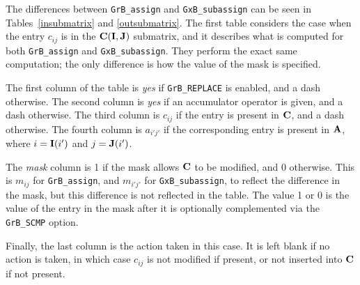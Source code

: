 \documentclass[12pt]{article}
\begin{document}
The differences between \verb'GrB_assign' and
\verb'GxB_subassign' can be seen in Tables~\ref{insubmatrix} and
\ref{outsubmatrix}.  The first table considers the case when the entry $c_{ij}$
is in the ${\bf C(I,J)}$ submatrix, and it describes what is computed for both
\verb'GrB_assign' and \verb'GxB_subassign'.  They perform the
exact same computation; the only difference is how the value of the mask is
specified.

The first column of the table is {\em yes} if \verb'GrB_REPLACE' is enabled,
and a dash otherwise.  The second column is {\em yes} if an accumulator
operator is given, and a dash otherwise.  The third column is $c_{ij}$ if the
entry is present in ${\bf C}$, and a dash otherwise.  The fourth column is
$a_{i'j'}$ if the corresponding entry is present in ${\bf A}$, where
$i={\bf I}(i')$ and $j={\bf J}(i')$.

The {\em mask} column is 1 if the mask allows ${\bf C}$ to be modified, and 0
otherwise.  This is $m_{ij}$ for \verb'GrB_assign', and $m_{i'j'}$ for
\verb'GxB_subassign', to reflect the difference in the mask, but this
difference is not reflected in the table.  The value 1 or 0 is the value of the
entry in the mask after it is optionally complemented via the \verb'GrB_SCMP'
option.

Finally, the last column is the action taken in this case.  It is left blank if
no action is taken, in which case $c_{ij}$ is not modified if present, or not
inserted into ${\bf C}$ if not present.
\end{document}
